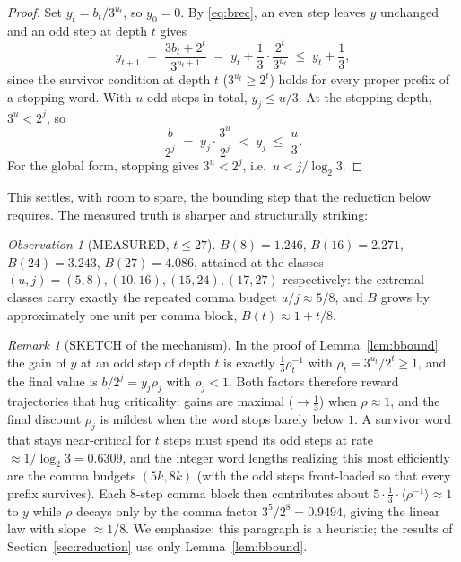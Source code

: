 \documentclass[10pt]{article}
\theoremstyle{definition}
\theoremstyle{remark}
\newtheorem{remark}[theorem]{Remark}
\newtheorem{observation}[theorem]{Observation}
\newcommand{\lb}{\log_2 3}
\begin{document}
\begin{proof}
Set $y_t = b_t/3^{u_t}$, so $y_0 = 0$. By \eqref{eq:brec}, an even step leaves
$y$ unchanged and an odd step at depth $t$ gives
\[
y_{t+1} \;=\; \frac{3b_t + 2^{t}}{3^{u_t+1}} \;=\; y_t +
\frac{1}{3}\cdot\frac{2^{t}}{3^{u_t}} \;\le\; y_t + \frac13,
\]
since the survivor condition at depth $t$ ($3^{u_t} \ge 2^{t}$) holds for
every proper prefix of a stopping word. With $u$ odd steps in total,
$y_j \le u/3$. At the stopping depth, $3^{u} < 2^{j}$, so
\[
\frac{b}{2^{j}} \;=\; y_j \cdot \frac{3^{u}}{2^{j}} \;<\; y_j \;\le\;
\frac{u}{3}.
\]
For the global form, stopping gives $3^{u} < 2^{j}$, i.e.\
$u < j/\lb$.
\end{proof}

This settles, with room to spare, the bounding step that the reduction below
requires. The measured truth is sharper and structurally striking:

\begin{observation}[MEASURED, $t \le 27$]\label{obs:bgrowth}
$B(8) = 1.246$, $B(16) = 2.271$, $B(24) = 3.243$, $B(27) = 4.086$, attained at
the classes $(u,j) = (5,8), (10,16), (15,24), (17,27)$ respectively: the
extremal classes carry exactly the repeated comma budget $u/j \approx 5/8$,
and $B$ grows by approximately one unit per comma block,
$B(t) \approx 1 + t/8$.
\end{observation}

\begin{remark}[SKETCH of the mechanism]
In the proof of Lemma~\ref{lem:bbound} the gain of $y$ at an odd step of
depth $t$ is exactly $\tfrac13 \rho_t^{-1}$ with
$\rho_t = 3^{u_t}/2^{t} \ge 1$, and the final value is
$b/2^{j} = y_j\rho_j$ with $\rho_j < 1$. Both factors therefore reward
trajectories that hug criticality: gains are maximal ($\to \tfrac13$) when
$\rho \approx 1$, and the final discount $\rho_j$ is mildest when the word
stops barely below $1$. A survivor word that stays near-critical for $t$
steps must spend its odd steps at rate $\approx 1/\lb = 0.6309$, and the
integer word lengths realizing this most efficiently are the comma budgets
$(5k, 8k)$ (with the odd steps front-loaded so that every prefix survives).
Each 8-step comma block then contributes about
$5 \cdot \tfrac13 \cdot \langle \rho^{-1} \rangle \approx 1$ to $y$ while
$\rho$ decays only by the comma factor $3^{5}/2^{8} = 0.9494$, giving the
linear law with slope $\approx 1/8$. We emphasize: this paragraph is a
heuristic; the results of Section~\ref{sec:reduction} use only
Lemma~\ref{lem:bbound}.
\end{remark}
\end{document}
